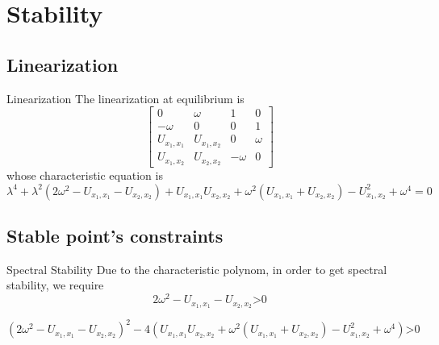 \documentclass{beamer}
\begin{document}
	
	\section{Stability}
	\subsection{Linearization}
	\begin{frame}
	\begin{block}{Linearization}
	The linearization at equilibrium is 
	\[\begin{bmatrix}
	0 & \omega & 1 & 0\\
	-\omega & 0 & 0 & 1 \\
	U_{x_1,x_1} & U_{x_1,x_2} & 0 & \omega\\
	U_{x_1,x_2} & U_{x_2,x_2} & -\omega & 0
	\end{bmatrix}\]
	whose characteristic equation is 
	\begin{dmath}
	\lambda^4+\lambda^2(2\omega^2-U_{x_1,x_1}-U_{x_2,x_2})+U_{x_1,x_1}U_{x_2,x_2}+\omega^2(U_{x_1,x_1}+U_{x_2,x_2})-U_{x_1,x_2}^2+\omega^4=0
	\end{dmath}
	\end{block}
	\end{frame}
		
	\subsection{Stable point's constraints}
	\begin{frame}
	\begin{block}{Spectral Stability}
	Due to the characteristic polynom, in order to get spectral stability, we require
	\begin{equation}
	2\omega^2-U_{x_1,x_1}-U_{x_2,x_2}\text{>}0
	\end{equation}
	
	\begin{dmath}
	(2\omega^2-U_{x_1,x_1}-U_{x_2,x_2})^2-4(U_{x_1,x_1}U_{x_2,x_2}+\omega^2(U_{x_1,x_1}+U_{x_2,x_2})-U_{x_1,x_2}^2+\omega^4)\text{>}0
	\end{dmath}
	\end{block}
	\end{frame}

\end{document}

